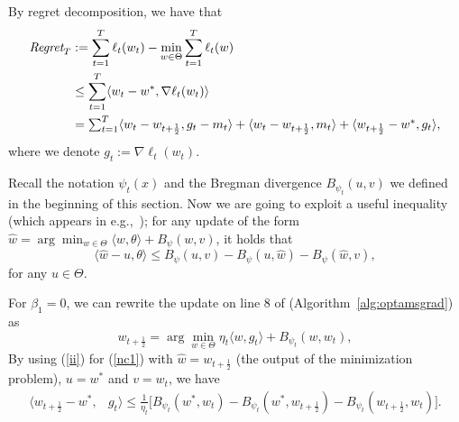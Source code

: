\documentclass[11pt]{article}
\makeatletter
\renewenvironment{proof}[1][\proofname]{%
   \par\pushQED{\qed}\normalfont%
   \topsep6\p@\@plus6\p@\relax
   \trivlist\item[\hskip\labelsep\bfseries#1]%
   \ignorespaces
}{%
   \popQED\endtrivlist\@endpefalse
}
\theoremstyle{k}
\makeatother
\begin{document}
\begin{proof}
By regret decomposition, we have that
\begin{equation} \label{nn1}
\begin{aligned}
\textstyle
 \text{\it Regret}_T  & := \sum_{t=1}^T \ell_t(w_t) - \min_{w \in \Theta} \sum_{t=1}^T \ell_t(w)  \textstyle  \\
 & \leq \sum_{t=1}^T  \langle w_t - w^*, \nabla \ell_t(w_t) \rangle
\\ & \textstyle = \sum_{t=1}^T \langle  w_t - w_{t+\frac{1}{2}} , g_t - m_t \rangle + \langle w_t - w_{t+\frac{1}{2}}, m_t \rangle + \langle w_{t+\frac{1}{2}} - w^*, g_t  \rangle,
\end{aligned}
\end{equation}
where we denote $g_t:=\nabla \ell_t(w_t)$.


Recall the notation $\psi_t(x)$ and the Bregman divergence $B_{\psi_t}(u,v)$
we defined in the beginning of this section.
Now we are going to exploit a useful inequality (which appears in e.g.,~\cite{T08}); for any update of the form $\hat{w} = \arg\min_{w \in \Theta} \langle w, \theta \rangle + B_{\psi}(w, v)$, it holds that
\begin{equation} \label{ii}
\textstyle{}
\langle \hat{w} - u, \theta \rangle \leq B_{\psi}( u, v ) - B_{\psi}( u, \hat{w}) - B_{\psi}( \hat{w}, v),
\end{equation}
for any $u \in \Theta$.

For $\beta_1=0$, we can rewrite the update on line 8 of (Algorithm~\ref{alg:optamsgrad}) as
\begin{equation} \label{nc1}
\textstyle w_{t+\frac{1}{2}} = \arg\min_{w \in \Theta} \eta_t \langle w, g_t \rangle
+ B_{\psi_t}(w, w_{t} ),
\end{equation}
By using (\ref{ii}) for (\ref{nc1}) with $\hat{w} = w_{t+\frac{1}{2}}$ (the output of the minimization problem), $u = w^*$ and $v = w_t$, we have
\begin{equation} \label{nn2}
\begin{aligned}
 \langle w_{t+\frac{1}{2}} - w^*, & g_t \rangle
\leq \frac{1}{\eta_t}\big[ B_{\psi_t}( w^*, w_{t}) -B_{\psi_t}(w^*,  w_{t+\frac{1}{2}} ) - B_{\psi_t}(w_{t+\frac{1}{2}}, w_{t}) \big].
\end{aligned}
\end{equation}


\end{proof}
\end{document}
